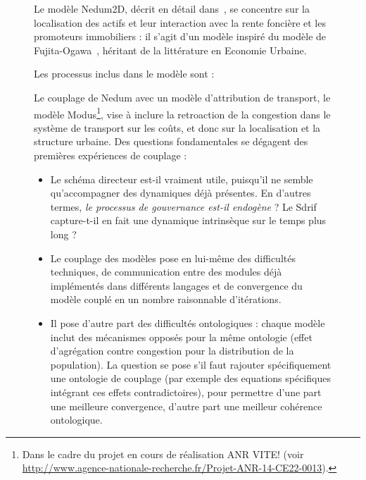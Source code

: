 \begin{figure}[h!]
	\begin{mdframed}
	
	
	
	Le modèle Nedum2D, décrit en détail dans~\cite{viguie2014downscaling}, se concentre sur la localisation des actifs et leur interaction avec la rente foncière et les promoteurs immobiliers : il s'agit d'un modèle inspiré du modèle de Fujita-Ogawa~\cite{fujita1982multiple}, héritant de la littérature en Economie Urbaine.
	
	Les processus inclus dans le modèle sont :
	
	
	Le couplage de Nedum avec un modèle d'attribution de transport, le modèle Modus\footnote{Dans le cadre du projet en cours de réalisation ANR VITE! (voir \url{http://www.agence-nationale-recherche.fr/Projet-ANR-14-CE22-0013}).}, vise à inclure la retroaction de la congestion dans le système de transport sur les coûts, et donc sur la localisation et la structure urbaine. Des questions fondamentales se dégagent des premières expériences de couplage :
	\begin{itemize}
		\item Le schéma directeur est-il vraiment utile, puisqu'il ne semble qu'accompagner des dynamiques déjà présentes. En d'autres termes, \textit{le processus de gouvernance est-il endogène} ? Le Sdrif capture-t-il en fait une dynamique intrinsèque sur le temps plus long ?
		\item Le couplage des modèles pose en lui-même des difficultés techniques, de communication entre des modules déjà implémentés dans différents langages et de convergence du modèle couplé en un nombre raisonnable d'itérations.
		\item Il pose d'autre part des difficultés ontologiques : chaque modèle inclut des mécanismes opposés pour la même ontologie (effet d'agrégation contre congestion pour la distribution de la population). La question se pose s'il faut rajouter spécifiquement une ontologie de couplage (par exemple des equations spécifiques intégrant ces effets contradictoires), pour permettre d'une part une meilleure convergence, d'autre part une meilleur cohérence ontologique.
	\end{itemize}
	
	
	

\end{mdframed}
\end{figure}
